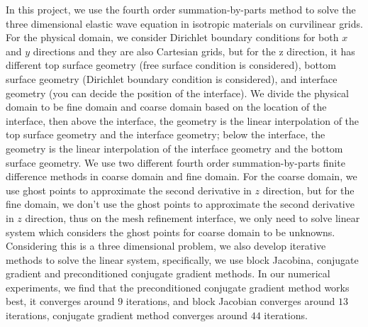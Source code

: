 \documentclass[fleqn]{article}
\begin{document}
In this project, we use the fourth order summation-by-parts method to solve the three dimensional elastic wave equation in isotropic materials on curvilinear grids. For the physical domain, we consider Dirichlet boundary conditions for both $x$ and $y$ directions and they are also Cartesian grids, but for the z direction, it has different top surface geometry (free surface condition is considered), bottom surface geometry (Dirichlet boundary condition is considered), and interface geometry (you can decide the position of the interface). We divide the physical domain to be fine domain and coarse domain based on the location of the interface, then above the interface, the geometry is the linear interpolation of the top surface geometry and the interface geometry; below the interface, the geometry is the linear interpolation of the interface geometry and the bottom surface geometry. We use two different fourth order summation-by-parts finite difference methods in coarse domain and fine domain. For the coarse domain, we use ghost points to approximate the second derivative in $z$ direction, but for the fine domain,  we don’t use the ghost points to approximate the second derivative in $z$ direction, thus on the mesh refinement interface, we only need to solve linear system which considers the ghost points for coarse domain to be unknowns. Considering this is a three dimensional problem, we also develop iterative methods to solve the linear system, specifically, we use block Jacobina, conjugate gradient and preconditioned conjugate gradient methods. In our numerical experiments, we find that the preconditioned conjugate gradient method works best, it converges around $9$ iterations, and block Jacobian converges around $13$ iterations, conjugate gradient method converges around $44$ iterations. 
\end{document}
